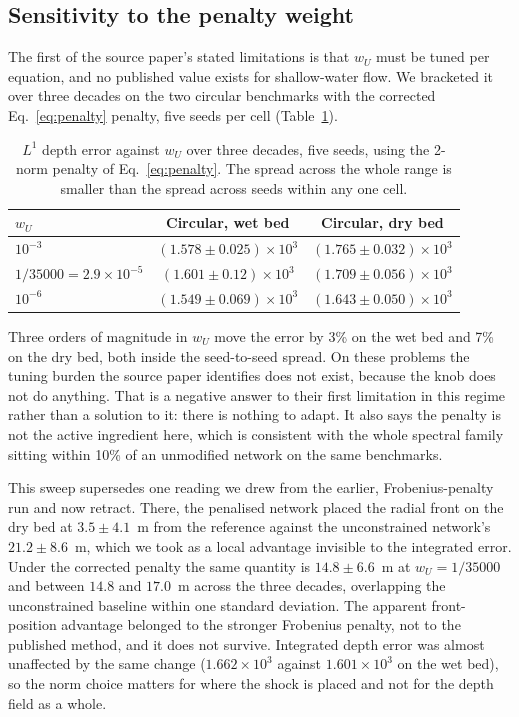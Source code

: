\documentclass[11pt]{article}
\newcommand{\wU}{w_U}
\begin{document}
\subsection{Sensitivity to the penalty weight}
\label{sec:sweep}

The first of the source paper's stated limitations is that $\wU$ must be tuned
per equation, and no published value exists for shallow-water flow. We
bracketed it over three decades on the two circular benchmarks with the
corrected Eq.~\eqref{eq:penalty} penalty, five seeds per cell
(Table~\ref{tab:sweep}).

\begin{table}[htbp]
\centering
\caption{$L^1$ depth error against $\wU$ over three decades, five seeds,
using the 2-norm penalty of Eq.~\eqref{eq:penalty}. The spread across the
whole range is smaller than the spread across seeds within any one cell.}
\label{tab:sweep}
\begin{tabular}{lcc}
\toprule
$\wU$ & Circular, wet bed & Circular, dry bed \\
\midrule
$10^{-3}$            & $(1.578\pm0.025)\times10^{3}$ & $(1.765\pm0.032)\times10^{3}$ \\
$1/35000 = 2.9\times10^{-5}$ & $(1.601\pm0.12)\times10^{3}$ & $(1.709\pm0.056)\times10^{3}$ \\
$10^{-6}$            & $(1.549\pm0.069)\times10^{3}$ & $(1.643\pm0.050)\times10^{3}$ \\
\bottomrule
\end{tabular}
\end{table}

Three orders of magnitude in $\wU$ move the error by 3\% on the wet bed and
7\% on the dry bed, both inside the seed-to-seed spread. On these problems
the tuning burden the source paper identifies does not exist, because the
knob does not do anything. That is a negative answer to their first
limitation in this regime rather than a solution to it: there is nothing to
adapt. It also says the penalty is not the active ingredient here, which is
consistent with the whole spectral family sitting within 10\% of an
unmodified network on the same benchmarks.

This sweep supersedes one reading we drew from the earlier, Frobenius-penalty
run and now retract. There, the penalised network placed the radial front on
the dry bed at $3.5\pm4.1$~m from the reference against the unconstrained
network's $21.2\pm8.6$~m, which we took as a local advantage invisible to the
integrated error. Under the corrected penalty the same quantity is
$14.8\pm6.6$~m at $\wU = 1/35000$ and between $14.8$ and $17.0$~m across the
three decades, overlapping the unconstrained baseline within one standard
deviation. The apparent front-position advantage belonged to the stronger
Frobenius penalty, not to the published method, and it does not survive.
Integrated depth error was almost unaffected by the same change
($1.662\times10^3$ against $1.601\times10^3$ on the wet bed), so the norm
choice matters for where the shock is placed and not for the depth field as a
whole.
\end{document}
